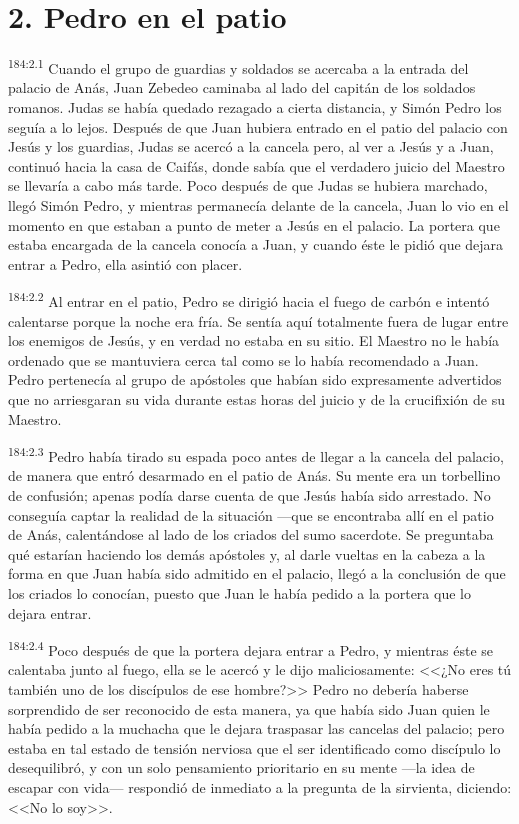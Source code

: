 \section*{2. Pedro en el patio}
\par 
\textsuperscript{184:2.1} Cuando el grupo de guardias y soldados se acercaba a la entrada del palacio de Anás, Juan Zebedeo caminaba al lado del capitán de los soldados romanos. Judas se había quedado rezagado a cierta distancia, y Simón Pedro los seguía a lo lejos. Después de que Juan hubiera entrado en el patio del palacio con Jesús y los guardias, Judas se acercó a la cancela pero, al ver a Jesús y a Juan, continuó hacia la casa de Caifás, donde sabía que el verdadero juicio del Maestro se llevaría a cabo más tarde. Poco después de que Judas se hubiera marchado, llegó Simón Pedro, y mientras permanecía delante de la cancela, Juan lo vio en el momento en que estaban a punto de meter a Jesús en el palacio. La portera que estaba encargada de la cancela conocía a Juan, y cuando éste le pidió que dejara entrar a Pedro, ella asintió con placer.

\par 
\textsuperscript{184:2.2} Al entrar en el patio, Pedro se dirigió hacia el fuego de carbón e intentó calentarse porque la noche era fría. Se sentía aquí totalmente fuera de lugar entre los enemigos de Jesús, y en verdad no estaba en su sitio. El Maestro no le había ordenado que se mantuviera cerca tal como se lo había recomendado a Juan. Pedro pertenecía al grupo de apóstoles que habían sido expresamente advertidos que no arriesgaran su vida durante estas horas del juicio y de la crucifixión de su Maestro.

\par 
\textsuperscript{184:2.3} Pedro había tirado su espada poco antes de llegar a la cancela del palacio, de manera que entró desarmado en el patio de Anás. Su mente era un torbellino de confusión; apenas podía darse cuenta de que Jesús había sido arrestado. No conseguía captar la realidad de la situación ---que se encontraba allí en el patio de Anás, calentándose al lado de los criados del sumo sacerdote. Se preguntaba qué estarían haciendo los demás apóstoles y, al darle vueltas en la cabeza a la forma en que Juan había sido admitido en el palacio, llegó a la conclusión de que los criados lo conocían, puesto que Juan le había pedido a la portera que lo dejara entrar.

\par 
\textsuperscript{184:2.4} Poco después de que la portera dejara entrar a Pedro, y mientras éste se calentaba junto al fuego, ella se le acercó y le dijo maliciosamente: <<¿No eres tú también uno de los discípulos de ese hombre?>> Pedro no debería haberse sorprendido de ser reconocido de esta manera, ya que había sido Juan quien le había pedido a la muchacha que le dejara traspasar las cancelas del palacio; pero estaba en tal estado de tensión nerviosa que el ser identificado como discípulo lo desequilibró, y con un solo pensamiento prioritario en su mente ---la idea de escapar con vida--- respondió de inmediato a la pregunta de la sirvienta, diciendo: <<No lo soy>>.

